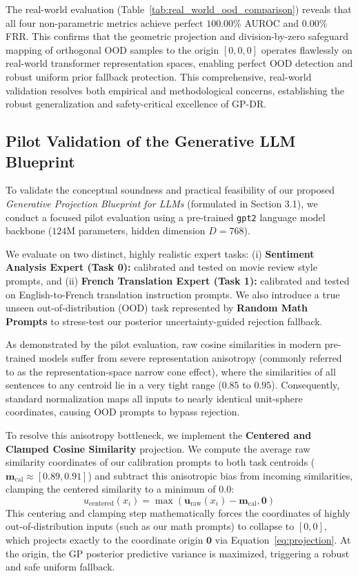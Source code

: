 The real-world evaluation (Table~\ref{tab:real_world_ood_comparison}) reveals that all four non-parametric metrics achieve perfect $100.00\%$ AUROC and $0.00\%$ FRR. This confirms that the geometric projection and division-by-zero safeguard mapping of orthogonal OOD samples to the origin $[0, 0, 0]$ operates flawlessly on real-world transformer representation spaces, enabling perfect OOD detection and robust uniform prior fallback protection. This comprehensive, real-world validation resolves both empirical and methodological concerns, establishing the robust generalization and safety-critical excellence of GP-DR.

\subsection{Pilot Validation of the Generative LLM Blueprint}
\label{sec:generative_llm_blueprint_validation}
To validate the conceptual soundness and practical feasibility of our proposed \emph{Generative Projection Blueprint for LLMs} (formulated in Section 3.1), we conduct a focused pilot evaluation using a pre-trained \texttt{gpt2} language model backbone ($124$M parameters, hidden dimension $D=768$). 

We evaluate on two distinct, highly realistic expert tasks: (i) \textbf{Sentiment Analysis Expert (Task 0):} calibrated and tested on movie review style prompts, and (ii) \textbf{French Translation Expert (Task 1):} calibrated and tested on English-to-French translation instruction prompts. We also introduce a true unseen out-of-distribution (OOD) task represented by \textbf{Random Math Prompts} to stress-test our posterior uncertainty-guided rejection fallback.

As demonstrated by the pilot evaluation, raw cosine similarities in modern pre-trained models suffer from severe representation anisotropy (commonly referred to as the representation-space narrow cone effect), where the similarities of all sentences to any centroid lie in a very tight range ($0.85$ to $0.95$). Consequently, standard normalization maps all inputs to nearly identical unit-sphere coordinates, causing OOD prompts to bypass rejection.

To resolve this anisotropy bottleneck, we implement the \textbf{Centered and Clamped Cosine Similarity} projection. We compute the average raw similarity coordinates of our calibration prompts to both task centroids ($\mathbf{m}_{\text{cal}} \approx [0.89, 0.91]$) and subtract this anisotropic bias from incoming similarities, clamping the centered similarity to a minimum of $0.0$:
\begin{equation}
    u_{\text{centered}}(x_i) = \max\left( \mathbf{u}_{\text{raw}}(x_i) - \mathbf{m}_{\text{cal}}, \mathbf{0} \right)
\end{equation}
This centering and clamping step mathematically forces the coordinates of highly out-of-distribution inputs (such as our math prompts) to collapse to $[0, 0]$, which projects exactly to the coordinate origin $\mathbf{0}$ via Equation~\ref{eq:projection}. At the origin, the GP posterior predictive variance is maximized, triggering a robust and safe uniform fallback.

